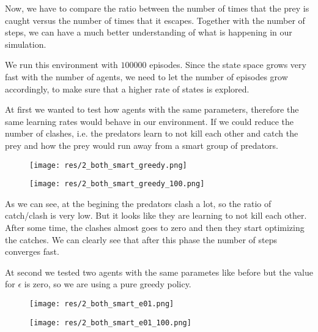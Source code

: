 \documentclass{article}
\begin{document}
Now, we have to compare the ratio between the number of times that the prey
is caught versus the number of times that it escapes. Together 
with the number of steps, we can have a much better understanding of what is
happening in our simulation.

We run this environment with $100000$ episodes. Since the state space grows
very fast with the number of agents, we need to let the number of episodes grow
accordingly, to make sure that a higher rate of states is explored.

At first we wanted to test how agents with the same parameters, therefore
the same learning rates would behave in our environment. If we could reduce the
number of clashes, i.e. the predators learn to not kill each other and catch the
prey and how the prey would run away from a smart group of predators.

\begin{figure}[htbp]
	\centering
	\begin{minipage}[t]{.45\linewidth}
		\centering
		\texttt{[image: res/2\_both\_smart\_greedy.png]}
	\end{minipage}
	\begin{minipage}[t]{.45\linewidth}
		\centering
		\texttt{[image: res/2\_both\_smart\_greedy\_100.png]}
	\end{minipage}
\end{figure}


As we can see, at the begining the predators clash a lot, so the ratio of
catch/clash is very low. But it looks like they are learning to not kill each
other. After some time, the clashes almost goes to zero and then they start
optimizing the catches. We can clearly see that after this phase the number of
steps converges fast.


At second we tested two agents with the same parametes like before but the value
for $\epsilon$ is zero, so we are using a pure greedy policy.

\begin{figure}[htbp]
	\centering
	\begin{minipage}[t]{.45\linewidth}
		\centering
		\texttt{[image: res/2\_both\_smart\_e01.png]}
	\end{minipage}
	\begin{minipage}[t]{.45\linewidth}
		\centering
		\texttt{[image: res/2\_both\_smart\_e01\_100.png]}
	\end{minipage}
\end{figure}
\end{document}
